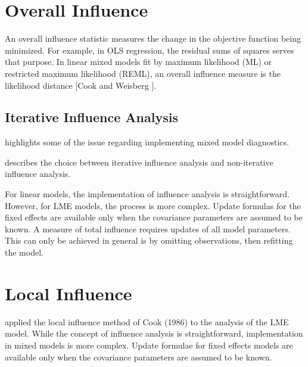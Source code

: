 \documentclass[12pt, a4paper]{report}
\theoremstyle{plain}
\theoremstyle{definition}
\theoremstyle{remark}
\begin{document}
\section{Overall Influence}
An overall influence statistic measures the change in the objective function being minimized. For example, in
OLS regression, the residual sums of squares serves that purpose. In linear mixed models fit by
 maximum likelihood (ML) or  restricted maximum likelihood (REML), an overall influence measure is the  likelihood distance [Cook and Weisberg ].


\subsection{Iterative Influence Analysis}

\citet{schabenberger} highlights some of the issue regarding implementing mixed model diagnostics.

\citet{schabenberger} describes the choice between  iterative influence analysis and  non-iterative influence analysis.



For linear models, the implementation of influence analysis is straightforward.
However, for LME models, the process is more complex. Update formulas for the fixed effects are available only when the covariance parameters are assumed to be known. A measure of total influence requires updates of all model parameters.
This can only be achieved in general is by omitting observations, then refitting the model.


%
%
%



\section{Local Influence}
\citet{Beckman} applied the local influence method of Cook (1986) to the analysis of the LME model.
While the concept of influence analysis is straightforward, implementation in mixed models is more complex. Update formulae for fixed effects models are available only when the covariance parameters are assumed to be known.
\end{document}
